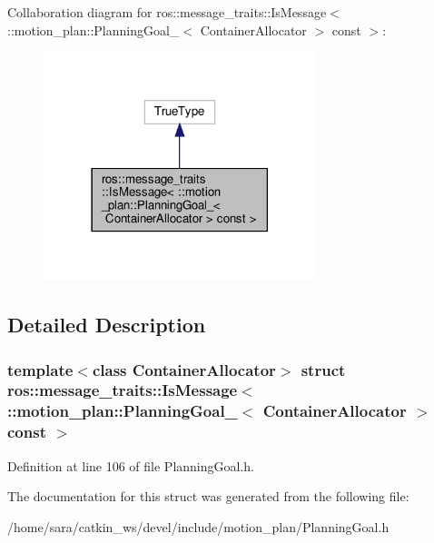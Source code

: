 Collaboration diagram for ros\+:\+:message\+\_\+traits\+:\+:Is\+Message$<$ \+:\+:motion\+\_\+plan\+:\+:Planning\+Goal\+\_\+$<$ Container\+Allocator $>$ const $>$\+:
\nopagebreak
\begin{figure}[H]
\begin{center}
\leavevmode
\includegraphics[width=225pt]{structros_1_1message__traits_1_1IsMessage_3_01_1_1motion__plan_1_1PlanningGoal___3_01ContainerAlac8589a0517a6e52e5bbfbf3d48bbb8d}
\end{center}
\end{figure}


\subsection{Detailed Description}
\subsubsection*{template$<$class Container\+Allocator$>$\newline
struct ros\+::message\+\_\+traits\+::\+Is\+Message$<$ \+::motion\+\_\+plan\+::\+Planning\+Goal\+\_\+$<$ Container\+Allocator $>$ const $>$}



Definition at line 106 of file Planning\+Goal.\+h.



The documentation for this struct was generated from the following file\+:\begin{DoxyCompactItemize}
\item 
/home/sara/catkin\+\_\+ws/devel/include/motion\+\_\+plan/Planning\+Goal.\+h\end{DoxyCompactItemize}

